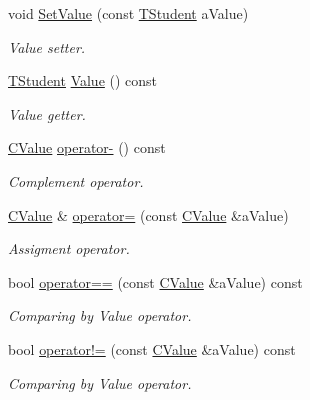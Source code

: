 \begin{DoxyCompactItemize}
void \hyperlink{class_c_value___t_student_1_1_c_value_a1fcbd9b398c97c4365de889a533c90e1}{Set\+Value} (const \hyperlink{struct_c_value___t_student_1_1_t_student}{T\+Student} a\+Value)
\begin{DoxyCompactList}\small\item\em Value setter. \end{DoxyCompactList}\item 
\hyperlink{struct_c_value___t_student_1_1_t_student}{T\+Student} \hyperlink{class_c_value___t_student_1_1_c_value_a8b3771c6800a24fd9933dd1aaf30261a}{Value} () const
\begin{DoxyCompactList}\small\item\em Value getter. \end{DoxyCompactList}\item 
\hyperlink{class_c_value___t_student_1_1_c_value}{C\+Value} \hyperlink{class_c_value___t_student_1_1_c_value_a7659b2e85b6f304c7a83e2ef4f4c3f8d}{operator-\/} () const
\begin{DoxyCompactList}\small\item\em Complement operator. \end{DoxyCompactList}\item 
\hyperlink{class_c_value___t_student_1_1_c_value}{C\+Value} \& \hyperlink{class_c_value___t_student_1_1_c_value_a837c1a449684ebdb0235449f214deb9d}{operator=} (const \hyperlink{class_c_value___t_student_1_1_c_value}{C\+Value} \&a\+Value)
\begin{DoxyCompactList}\small\item\em Assigment operator. \end{DoxyCompactList}\item 
bool \hyperlink{class_c_value___t_student_1_1_c_value_a81e74014d65406bce259c0b37df25992}{operator==} (const \hyperlink{class_c_value___t_student_1_1_c_value}{C\+Value} \&a\+Value) const
\begin{DoxyCompactList}\small\item\em Comparing by Value operator. \end{DoxyCompactList}\item 
bool \hyperlink{class_c_value___t_student_1_1_c_value_a8c4c7ec16e82c22d526efe356a043361}{operator!=} (const \hyperlink{class_c_value___t_student_1_1_c_value}{C\+Value} \&a\+Value) const
\begin{DoxyCompactList}\small\item\em Comparing by Value operator. \end{DoxyCompactList}\item 

\end{DoxyCompactItemize}
